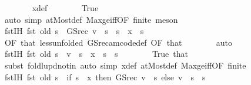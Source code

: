 \begin{isabellebody}
\ \ \ \ \ \ \isamarkupfalse%
\ x{\isacharprime}{\kern0pt}{\isacharunderscore}{\kern0pt}def\isanewline
\ \ \ \ \ \ \isamarkupfalse%
\ True\isanewline
\ \ \ \ \ \ \isamarkupfalse%
\ {\isacharparenleft}{\kern0pt}auto\ simp{\isacharcolon}{\kern0pt}\ atMost{\isacharunderscore}{\kern0pt}def\ Max{\isacharunderscore}{\kern0pt}ge{\isacharunderscore}{\kern0pt}iff{\isacharbrackleft}{\kern0pt}OF\ finite{\isacharbrackright}{\kern0pt}{\isacharparenright}{\kern0pt}\ meson\isanewline
\ \ \ \ \isamarkupfalse%
\ fst{\isacharunderscore}{\kern0pt}IH{\isacharcolon}{\kern0pt}\ {\isachardoublequoteopen}fst\ {\isacharparenleft}{\kern0pt}{\isacharquery}{\kern0pt}old\ s{\isacharparenright}{\kern0pt}\ {\isacharequal}{\kern0pt}\ GS{\isacharunderscore}{\kern0pt}rec\ v\ {\isachardollar}{\kern0pt}\ s{\isachardoublequoteclose}\ \ {\isachardoublequoteopen}s\ {\isacharless}{\kern0pt}\ x{\isachardoublequoteclose}\ \ s\isanewline
\ \ \ \ \ \ \isamarkupfalse%
\ {}{\isacharbrackleft}{\kern0pt}OF\ that{\isacharbrackright}{\kern0pt}\ less{\isacharbrackleft}{\kern0pt}unfolded\ GS{\isacharunderscore}{\kern0pt}rec{\isacharunderscore}{\kern0pt}am{\isacharunderscore}{\kern0pt}code{\isacharunderscore}{\kern0pt}def{\isacharcomma}{\kern0pt}\ OF\ that{\isacharbrackright}{\kern0pt}\isanewline
\ \ \ \ \ \ \isamarkupfalse%
\ auto\isanewline
\ \ \ \ \isamarkupfalse%
\ fst{\isacharunderscore}{\kern0pt}IH{\isacharprime}{\kern0pt}{\isacharcolon}{\kern0pt}\ {\isachardoublequoteopen}fst\ {\isacharparenleft}{\kern0pt}{\isacharquery}{\kern0pt}old\ s{\isacharparenright}{\kern0pt}\ {\isacharequal}{\kern0pt}\ v\ {\isachardollar}{\kern0pt}\ s{\isachardoublequoteclose}\ \ {\isachardoublequoteopen}x\ {\isasymle}\ s{\isachardoublequoteclose}\ \ s\isanewline
\ \ \ \ \ \ \isamarkupfalse%
\ True\ that\isanewline
\ \ \ \ \ \ \isamarkupfalse%
\ {\isacharparenleft}{\kern0pt}subst\ foldl{\isacharunderscore}{\kern0pt}upd{\isacharunderscore}{\kern0pt}notin{\isacharparenright}{\kern0pt}\ {\isacharparenleft}{\kern0pt}auto\ simp{\isacharcolon}{\kern0pt}\ x{\isacharprime}{\kern0pt}{\isacharunderscore}{\kern0pt}def\ atMost{\isacharunderscore}{\kern0pt}def\ Max{\isacharunderscore}{\kern0pt}ge{\isacharunderscore}{\kern0pt}iff{\isacharbrackleft}{\kern0pt}OF\ finite{\isacharbrackright}{\kern0pt}{\isacharparenright}{\kern0pt}\isanewline
\ \ \ \ \isamarkupfalse%
\ fst{\isacharunderscore}{\kern0pt}IH{\isacharprime}{\kern0pt}{\isacharprime}{\kern0pt}{\isacharcolon}{\kern0pt}\ {\isachardoublequoteopen}fst\ {\isacharparenleft}{\kern0pt}{\isacharquery}{\kern0pt}old\ s{\isacharparenright}{\kern0pt}\ {\isacharequal}{\kern0pt}\ {\isacharparenleft}{\kern0pt}if\ s\ {\isacharless}{\kern0pt}\ x\ then\ GS{\isacharunderscore}{\kern0pt}rec\ v\ {\isachardollar}{\kern0pt}\ s\ else\ v\ {\isachardollar}{\kern0pt}\ s{\isacharparenright}{\kern0pt}{\isachardoublequoteclose}\ \ s\isanewline

\end{isabellebody}

